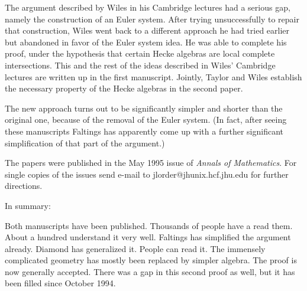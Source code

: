 The argument described by Wiles in his Cambridge
lectures had a serious gap, namely the construction of an
Euler system.  After trying unsuccessfully to repair that construction,
Wiles went back to a different approach he had tried earlier but
abandoned in favor of the Euler system idea.  He was able to complete his
proof, under the hypothesis that certain Hecke algebras are local complete
intersections.  This and the rest of the ideas described in Wiles'
Cambridge lectures are written up in the first manuscript.  Jointly,
Taylor and Wiles establish the necessary property of the Hecke
algebras in the second paper.

The new approach turns out to be significantly simpler and
shorter than the original one, because of the removal of the Euler system.
(In fact, after seeing these manuscripts Faltings has apparently come up
with a further significant simplification of that part of the argument.)


The papers were published in the May 1995 issue of {\it Annals of Mathematics}.
For single copies of the issues send e-mail to jlorder@jhunix.hcf.jhu.edu
for further directions.

In summary:

Both manuscripts have been published. Thousands of people have a read them. 
About a hundred understand it very well. Faltings has simplified
the argument already. Diamond has generalized it. People can read
it. The immensely complicated geometry has mostly been replaced by
simpler algebra. The proof is now generally accepted. There was a gap
in this second proof as well, but it has been filled since
October 1994. 

%
%

